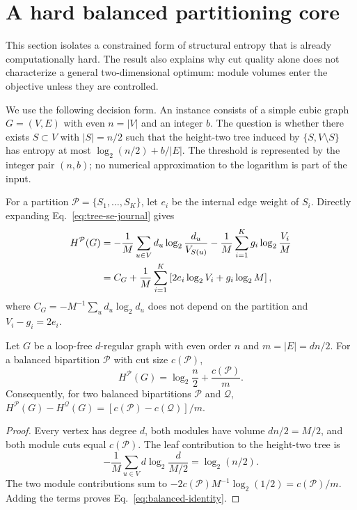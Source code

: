 \section{A hard balanced partitioning core}\label{sec:hardness}

This section isolates a constrained form of structural entropy that is already
computationally hard. The result also explains why cut quality alone does not
characterize a general two-dimensional optimum: module volumes enter the
objective unless they are controlled.

We use the following decision form. An instance consists of a simple cubic
graph $G=(V,E)$ with even $n=|V|$ and an integer $b$. The question is whether
there exists $S\subset V$ with $|S|=n/2$ such that the height-two tree induced
by $\{S,V\setminus S\}$ has entropy at most
$\log_2(n/2)+b/|E|$. The threshold is represented by the integer pair
$(n,b)$; no numerical approximation to the logarithm is part of the input.

For a partition $\mathcal P=\{S_1,\ldots,S_K\}$, let $e_i$ be the internal
edge weight of $S_i$. Directly expanding Eq.~\eqref{eq:tree-se-journal} gives
\begin{align}
 H^{\mathcal P}(G)
 &= -\frac{1}{M}\sum_{u\in V}d_u\log_2\frac{d_u}{V_{S(u)}}
    -\frac{1}{M}\sum_{i=1}^{K}g_i\log_2\frac{V_i}{M}\notag\\
 &= C_G+\frac{1}{M}\sum_{i=1}^{K}
 \left[2e_i\log_2 V_i+g_i\log_2 M\right],
 \label{eq:partition-form}
\end{align}
where $C_G=-M^{-1}\sum_ud_u\log_2d_u$ does not depend on the partition and
$V_i-g_i=2e_i$.

\begin{lemma}\label{lem:bisection-identity}
Let $G$ be a loop-free $d$-regular graph with even order $n$ and
$m=|E|=dn/2$. For a balanced bipartition $\mathcal P$ with cut size
$c(\mathcal P)$,
\begin{equation}
 H^{\mathcal P}(G)=\log_2\frac{n}{2}+\frac{c(\mathcal P)}{m}.
 \label{eq:balanced-identity}
\end{equation}
Consequently, for two balanced bipartitions $\mathcal P$ and $\mathcal Q$,
$H^{\mathcal P}(G)-H^{\mathcal Q}(G)=
[c(\mathcal P)-c(\mathcal Q)]/m$.
\end{lemma}

\begin{proof}
Every vertex has degree $d$, both modules have volume $dn/2=M/2$, and both
module cuts equal $c(\mathcal P)$. The leaf contribution to the height-two
tree is
\[
 -\frac{1}{M}\sum_{u\in V}d\log_2\frac{d}{M/2}
 =\log_2(n/2).
\]
The two module contributions sum to
$-2c(\mathcal P)M^{-1}\log_2(1/2)=c(\mathcal P)/m$.
Adding the terms proves Eq.~\eqref{eq:balanced-identity}.
\end{proof}

